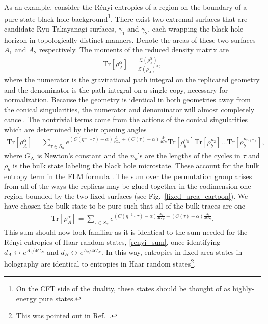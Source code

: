 \documentclass[a4paper,11pt]{article}
\newcommand{\Tr}{\text{Tr}}
\newcommand*{\SR}[1]{\textcolor{magenta}{[SR: \textsf{#1}]}}
\begin{document}
As an example, consider the R\'enyi entropies of a region on the boundary of a pure state black hole background\footnote{On the CFT side of the duality, these states should be thought of as highly-energy pure states.}. There exist two extremal surfaces that are candidate Ryu-Takayanagi surfaces, $\gamma_1$ and $\gamma_2$, each wrapping the black hole horizon in topologically distinct manners. Denote the areas of these two surfaces $A_1$ and $A_2$ respectively. The moments of the reduced density matrix are
\begin{align}
    \Tr \left[ \rho_A^{\alpha} \right]= \frac{\mathcal{Z}(\rho_A^{{\alpha}})}{\mathcal{Z}(\rho_A)^{\alpha}},
\end{align}
where the numerator is the gravitational path integral on the replicated geometry and the denominator is the path integral on a single copy, necessary for normalization. Because the geometry is identical in both geometries away from the conical singularities, the numerator and denominator will almost completely cancel. The nontrivial terms come from the actions of the conical singularities which are determined by their opening angles
\begin{align}
    \Tr \left[ \rho_A^{\alpha} \right]= \sum_{\tau \in S_{\alpha}} e^{(C(\eta^{-1}\circ \tau)-\alpha) \frac{A_1}{4G_N} + (C(\tau)-\alpha) \frac{A_2}{4G_N}}\Tr\left[\rho_b^{n_1}\right]\Tr\left[\rho_b^{n_2}\right]\dots\Tr\left[\rho_b^{n_{C(\tau)}}\right],
\end{align}
where $G_N$ is Newton's
constant and
the $n_k$'s are the lengths of the cycles in $\tau$ and $\rho_b$ is the bulk state labeling the black hole microstate. These account for the bulk entropy term in the FLM formula \cite{2013JHEP...11..074F}.
The sum over the permutation group arises from all of the ways the replicas may be glued together in the codimension-one region bounded by the two fixed surfaces (see Fig.~\ref{fixed_area_cartoon}). We have chosen the bulk state to be pure such that all of the bulk traces are one
\begin{align}
    \Tr \left[ \rho_A^{\alpha} \right]= \sum_{\tau \in S_{\alpha}} e^{(C(\eta^{-1}\circ \tau)-\alpha)\frac{A_1}{4G_N} + (C(\tau)-\alpha) \frac{A_2}{4G_N}}.
\end{align}
This sum should now look familiar as it is identical to the sum needed for the R\'enyi entropies of Haar random states, \eqref{renyi_sum}, once identifying $d_A \leftrightarrow e^{A_1/4G_N}$ and $d_B \leftrightarrow e^{A_2/4G_N}$. In this way, entropies in fixed-area states in holography are identical to entropies in Haar random states\footnote{This was pointed out in Ref.~\cite{2019arXiv191111977P}.}. 
\end{document}
